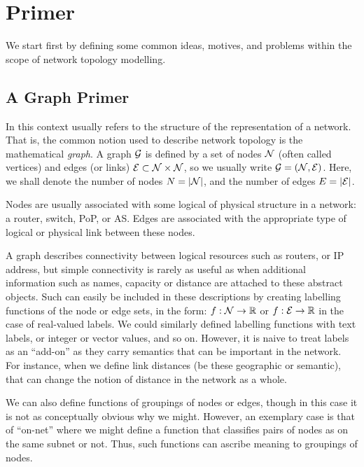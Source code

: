 \section{Primer}

We start first by defining some common ideas, motives, and problems
within the scope of network topology modelling. 

\subsection{A Graph Primer}

In this context  usually refers to the structure of
the  representation of a network. That is, the common
notion used to describe network topology is the mathematical {\em
  graph}.  A graph ${\cal G}$ is defined by a set of
nodes ${\cal N}$ (often called vertices) and edges (or links) ${\cal
  E} \subset {\cal N} \times {\cal N}$, so we usually write ${\cal G}
= ( {\cal N}, {\cal E})$.  Here, we shall denote the number of nodes
$N = |{\cal N}|$, and the number of edges $E = |{\cal E}|$.

Nodes are usually associated with some logical of physical structure
in a network: a router, switch, PoP, or AS. Edges are associated with
the appropriate type of logical or physical link between these nodes. 

A graph describes connectivity between logical resources such as
routers, or IP address, but simple connectivity is rarely as useful as
when additional information such as names, capacity or distance are
attached to these abstract objects. Such can easily be included in
these descriptions by creating labelling functions of the node or edge
sets, in the form: $f: {\cal N} \rightarrow \mathbb{R}$ or $f: {\cal E}
\rightarrow \mathbb{R}$ in the case of real-valued labels. We could similarly
defined labelling functions with text labels, or integer or vector
values, and so on. However, it is naive to treat labels as an
``add-on'' as they carry semantics that can be important in the
network. For instance, when we define link distances (be these
geographic or semantic), that can change the notion of distance in the
network as a whole.

We can also define functions of groupings of nodes or edges, though in
this case it is not as conceptually obvious why we might. However, an
exemplary case is that of ``on-net'' where we might define a function
that classifies pairs of nodes as on the same subnet or not. Thus,
such functions can ascribe meaning to groupings of nodes. 

